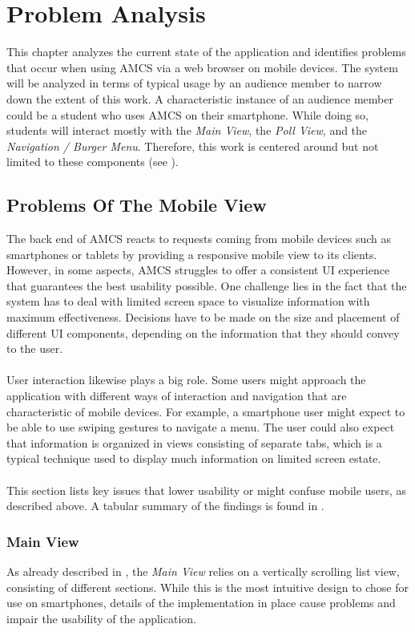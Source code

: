 \chapter{Problem Analysis}
\label{chapter:concept}
This chapter analyzes the current state of the application and identifies problems that occur when using AMCS via a web browser on mobile
devices. The system will be analyzed in terms of typical usage by an audience member to narrow down the extent of this work. A characteristic instance of an audience member could be a student who uses AMCS on their smartphone.  While doing so, students will interact mostly with the \emph{Main View}, the \emph{Poll View}, and the \emph{Navigation / Burger Menu}. Therefore, this work is centered around but not limited to these components (see ).

\section{Problems Of The Mobile View}
\label{section:con:problems}
The back end of AMCS reacts to requests coming from mobile devices such as smartphones or tablets by providing a responsive mobile view to its clients. However, in some aspects, AMCS struggles to offer a consistent UI experience that guarantees the best usability possible.
One challenge lies in the fact that the system has to deal with limited screen space to visualize information with maximum effectiveness. Decisions have to be made on the size and placement of different UI components, depending on the information that they should convey to the user.
\\
\\
User interaction likewise plays a big role. Some users might approach the application with different ways of interaction and navigation that are characteristic of mobile devices. For example, a smartphone user might expect to be able to use swiping gestures to navigate a menu. The user could also expect that information is organized in views consisting of separate tabs, which is a typical technique used to display much information on limited screen estate.
\\
\\ 
This section lists key issues that lower usability or might confuse mobile users, as described above. A tabular summary of the findings is found in .

\subsection{Main View}
As already described in , the \emph{Main View} relies on a vertically scrolling list view, consisting of different sections. While this is the most intuitive design to chose for use on smartphones, details of the implementation in place cause problems and impair the usability of the application.

